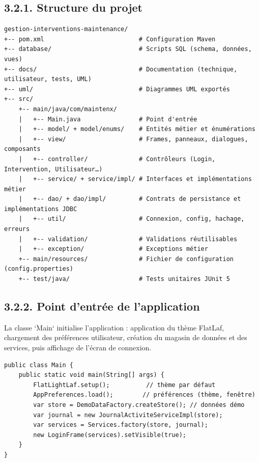 \documentclass[11pt,a4paper]{report}
\begin{document}
\subsection*{3.2.1. Structure du projet}
\begin{lstlisting}
gestion-interventions-maintenance/
+-- pom.xml                          # Configuration Maven
+-- database/                        # Scripts SQL (schema, données, vues)
+-- docs/                            # Documentation (technique, utilisateur, tests, UML)
+-- uml/                             # Diagrammes UML exportés
+-- src/
    +-- main/java/com/maintenx/
    |   +-- Main.java                # Point d'entrée
    |   +-- model/ + model/enums/    # Entités métier et énumérations
    |   +-- view/                    # Frames, panneaux, dialogues, composants
    |   +-- controller/              # Contrôleurs (Login, Intervention, Utilisateur…)
    |   +-- service/ + service/impl/ # Interfaces et implémentations métier
    |   +-- dao/ + dao/impl/         # Contrats de persistance et implémentations JDBC
    |   +-- util/                    # Connexion, config, hachage, erreurs
    |   +-- validation/              # Validations réutilisables
    |   +-- exception/               # Exceptions métier
    +-- main/resources/              # Fichier de configuration (config.properties)
    +-- test/java/                   # Tests unitaires JUnit 5
\end{lstlisting}
\subsection*{3.2.2. Point d'entrée de l'application}

La classe `Main` initialise l'application : application du thème FlatLaf, chargement des préférences utilisateur, création du magasin de données et des services, puis affichage de l'écran de connexion.
\begin{lstlisting}
public class Main {
    public static void main(String[] args) {
        FlatLightLaf.setup();          // thème par défaut
        AppPreferences.load();        // préférences (thème, fenêtre)
        var store = DemoDataFactory.createStore(); // données démo
        var journal = new JournalActiviteServiceImpl(store);
        var services = Services.factory(store, journal);
        new LoginFrame(services).setVisible(true);
    }
}
\end{lstlisting}
\end{document}
